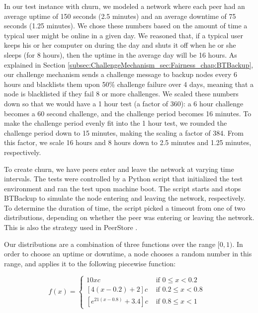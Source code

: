 \documentclass[12pt]{report}
\begin{document}
In our test instance with churn, we modeled a network where each peer had an average uptime of 150 seconds (2.5 minutes) and an average downtime of 75 seconds (1.25 minutes). We chose these numbers based on the amount of time a typical user might be online in a given day. We reasoned that, if a typical user keeps his or her computer on during the day and shuts it off when he or she sleeps (for 8 hours), then the uptime in the average day will be 16 hours. As explained in Section \ref{subsec:ChallengeMechanism_sec:Fairness_chap:BTBackup}, our challenge mechanism sends a challenge message to backup nodes every 6 hours and blacklists them upon 50\% challenge failure over 4 days, meaning that a node is blacklisted if they fail 8 or more challenges. We scaled these numbers down so that we would have a 1 hour test (a factor of 360): a 6 hour challenge becomes a 60 second challenge, and the challenge period becomes 16 minutes. To make the challenge period evenly fit into the 1 hour test, we rounded the challenge period down to 15 minutes, making the scaling a factor of 384. From this factor, we scale 16 hours and 8 hours down to 2.5 minutes and 1.25 minutes, respectively.

To create churn, we have peers enter and leave the network at varying time intervals. The tests were controlled by a Python script that initialized the test environment and ran the test upon machine boot. The script starts and stops BTBackup to simulate the node entering and leaving the network, respectively. To determine the duration of time, the script picked a timeout from one of two distributions, depending on whether the peer was entering or leaving the network.  This is also the strategy used in PeerStore \cite{PeerStore}.

Our distributions are a combination of three functions over the range $[0,1)$. In order to choose an uptime or downtime, a node chooses a random number in this range, and applies it to the following piecewise function:

$$
f(x)=
\begin{cases}
10xc & \mbox{ if $0 \leq x < 0.2$ } \\
[4(x-0.2)+2]c & \mbox{ if $0.2 \leq x < 0.8$ } \\
[e^{21(x-0.8)}+3.4]c & \mbox{ if $0.8 \leq x < 1$ }
\end{cases}
$$
\end{document}
